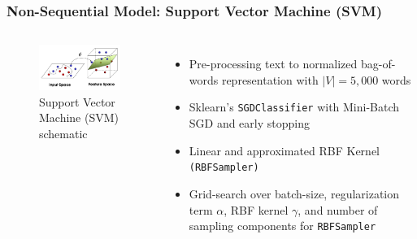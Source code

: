 \documentclass{beamer}
\begin{document}
\begin{framefont}{\footnotesize}
	\begin{frame}
		\frametitle{Non-Sequential Model: Support Vector Machine (SVM)}
		\vspace{-10pt}
		\begin{columns}
			\centering
			\begin{figure}
				\captionsetup{justification=centering}
				\includegraphics[width=4.3cm]{svm.png}
				\caption{Support Vector Machine (SVM) schematic \parencite{svmSchematic}}
			\end{figure}
			\begin{itemize}
				\setlength\itemsep{1.5em}
				\item Pre-processing text to normalized bag-of-words representation with $|V| = 5,000$ words
				\item Sklearn's \texttt{SGDClassifier} with Mini-Batch SGD and early stopping
				\item Linear and approximated RBF Kernel \texttt{(RBFSampler)}
				\item Grid-search over batch-size, regularization term $\alpha$, RBF kernel $\gamma$, and number of sampling components for \texttt{RBFSampler}
			\end{itemize}
		\end{columns}
	\end{frame}
\end{framefont}
\end{document}
